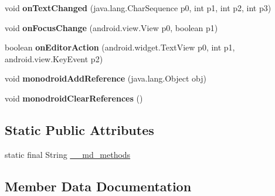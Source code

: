 \begin{DoxyCompactItemize}
void {\bfseries on\+Text\+Changed} (java.\+lang.\+Char\+Sequence p0, int p1, int p2, int p3)
\item 
\mbox{\label{classmd5b60ffeb829f638581ab2bb9b1a7f4f3f_1_1_entry_cell_view_a6c445e9cfc29651b0b8e0809663ab5b8}} 
void {\bfseries on\+Focus\+Change} (android.\+view.\+View p0, boolean p1)
\item 
\mbox{\label{classmd5b60ffeb829f638581ab2bb9b1a7f4f3f_1_1_entry_cell_view_a32acde16da027f419d2b0456f5bc4ada}} 
boolean {\bfseries on\+Editor\+Action} (android.\+widget.\+Text\+View p0, int p1, android.\+view.\+Key\+Event p2)
\item 
\mbox{\label{classmd5b60ffeb829f638581ab2bb9b1a7f4f3f_1_1_entry_cell_view_a8aa0a5d92b90e3037d35cce81ecf8b6b}} 
void {\bfseries monodroid\+Add\+Reference} (java.\+lang.\+Object obj)
\item 
\mbox{\label{classmd5b60ffeb829f638581ab2bb9b1a7f4f3f_1_1_entry_cell_view_a8bc0e236db435f7673b1350dca4cb844}} 
void {\bfseries monodroid\+Clear\+References} ()
\end{DoxyCompactItemize}
\subsection*{Static Public Attributes}
\begin{DoxyCompactItemize}
\item 
static final String \hyperlink{classmd5b60ffeb829f638581ab2bb9b1a7f4f3f_1_1_entry_cell_view_a58b79ef4732c97fcac8b0839aabf25e6}{\+\_\+\+\_\+md\+\_\+methods}
\end{DoxyCompactItemize}


\subsection{Member Data Documentation}
\mbox{\label{classmd5b60ffeb829f638581ab2bb9b1a7f4f3f_1_1_entry_cell_view_a58b79ef4732c97fcac8b0839aabf25e6}} 
